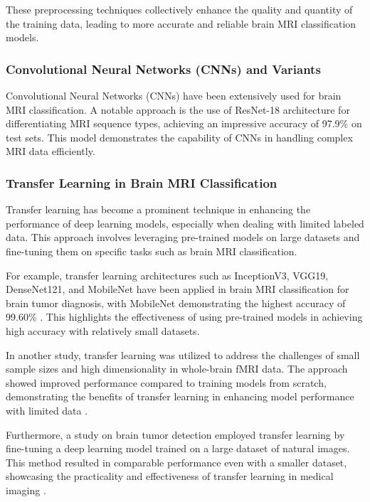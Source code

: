 These preprocessing techniques collectively enhance the quality and quantity of the training data, leading to more accurate and reliable brain MRI classification models.

\subsubsection{Convolutional Neural Networks (CNNs) and Variants}

Convolutional Neural Networks (CNNs) have been extensively used for brain MRI classification. A notable approach is the use of ResNet-18 architecture for differentiating MRI sequence types, achieving an impressive accuracy of 97.9\% on test sets. This model demonstrates the capability of CNNs in handling complex MRI data efficiently\cite{doi:10.1148/ryai.230095}.

\subsubsection{Transfer Learning in Brain MRI Classification}

Transfer learning has become a prominent technique in enhancing the performance of deep learning models, especially when dealing with limited labeled data. This approach involves leveraging pre-trained models on large datasets and fine-tuning them on specific tasks such as brain MRI classification.

For example, transfer learning architectures such as InceptionV3, VGG19, DenseNet121, and MobileNet have been applied in brain MRI classification for brain tumor diagnosis, with MobileNet demonstrating the highest accuracy of 99.60\% \cite{Islam_Barua_Rahman_Ahammed_Akter_Uddin_2023}. This highlights the effectiveness of using pre-trained models in achieving high accuracy with relatively small datasets.

In another study, transfer learning was utilized to address the challenges of small sample sizes and high dimensionality in whole-brain fMRI data. The approach showed improved performance compared to training models from scratch, demonstrating the benefits of transfer learning in enhancing model performance with limited data \cite{10.1007/978-3-030-32695-1_7}.

Furthermore, a study on brain tumor detection employed transfer learning by fine-tuning a deep learning model trained on a large dataset of natural images. This method resulted in comparable performance even with a smaller dataset, showcasing the practicality and effectiveness of transfer learning in medical imaging \cite{10125766}.

